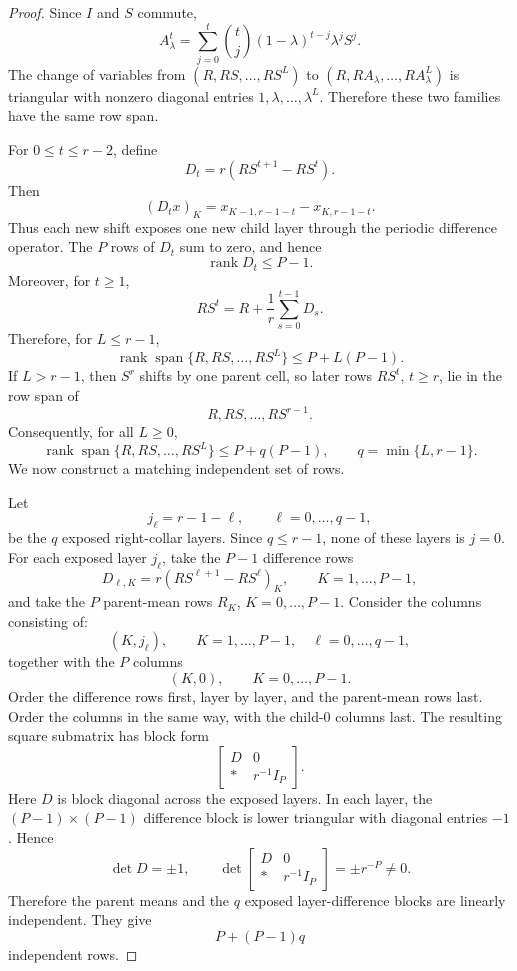 \documentclass[preprint,12pt]{elsarticle}
\theoremstyle{plain}
\theoremstyle{remark}
\theoremstyle{definition}
\DeclareMathOperator{\rank}{rank}
\begin{document}
\begin{proof}
Since \(I\) and \(S\) commute,
\[
  A_\lambda^t
  =
  \sum_{j=0}^{t}
  \binom{t}{j}
  (1-\lambda)^{t-j}\lambda^j S^j .
\]
The change of variables from
\((R,RS,\ldots,RS^L)\) to
\((R,RA_\lambda,\ldots,RA_\lambda^L)\) is triangular with nonzero diagonal
entries \(1,\lambda,\ldots,\lambda^L\).  Therefore these two families have
the same row span.

For \(0\le t\le r-2\), define
\[
  D_t=r(RS^{t+1}-RS^t).
\]
Then
\[
  (D_t x)_K
  =
  x_{K-1,r-1-t}-x_{K,r-1-t}.
\]
Thus each new shift exposes one new child layer through the periodic
difference operator.  The \(P\) rows of \(D_t\) sum to zero, and hence
\[
  \rank D_t\le P-1.
\]
Moreover, for \(t\ge1\),
\[
  RS^t
  =
  R+\frac1r\sum_{s=0}^{t-1}D_s.
\]
Therefore, for \(L\le r-1\),
\[
  \rank\operatorname{span}\{R,RS,\ldots,RS^L\}
  \le
  P+L(P-1).
\]
If \(L>r-1\), then \(S^r\) shifts by one parent cell, so later rows
\(RS^t\), \(t\ge r\), lie in the row span of
\[
  R,RS,\ldots,RS^{r-1}.
\]
Consequently, for all \(L\ge0\),
\[
  \rank\operatorname{span}\{R,RS,\ldots,RS^L\}
  \le
  P+q(P-1),
  \qquad
  q=\min\{L,r-1\}.
\]
We now construct a matching independent set of rows.

Let
\[
  j_\ell=r-1-\ell,
  \qquad
  \ell=0,\ldots,q-1,
\]
be the \(q\) exposed right-collar layers.  Since \(q\le r-1\), none of these
layers is \(j=0\).  For each exposed layer \(j_\ell\), take the \(P-1\)
difference rows
\[
  D_{\ell,K}
  =
  r(RS^{\ell+1}-RS^\ell)_K,
  \qquad
  K=1,\ldots,P-1,
\]
and take the \(P\) parent-mean rows \(R_K\), \(K=0,\ldots,P-1\).  Consider
the columns consisting of:
\[
  (K,j_\ell),\qquad K=1,\ldots,P-1,\quad \ell=0,\ldots,q-1,
\]
together with the \(P\) columns
\[
  (K,0),\qquad K=0,\ldots,P-1.
\]
Order the difference rows first, layer by layer, and the parent-mean rows
last.  Order the columns in the same way, with the child-\(0\) columns last.
The resulting square submatrix has block form
\[
  \begin{bmatrix}
  D & 0\\
  * & r^{-1}I_P
  \end{bmatrix}.
\]
Here \(D\) is block diagonal across the exposed layers.  In each layer, the
\((P-1)\times(P-1)\) difference block is lower triangular with diagonal
entries \(-1\).  Hence
\[
  \det D=\pm1,
  \qquad
  \det
  \begin{bmatrix}
  D & 0\\
  * & r^{-1}I_P
  \end{bmatrix}
  =
  \pm r^{-P}\ne0.
\]
Therefore the parent means and the \(q\) exposed layer-difference blocks are
linearly independent.  They give
\[
  P+(P-1)q
\]
independent rows.


\end{proof}
\end{document}

